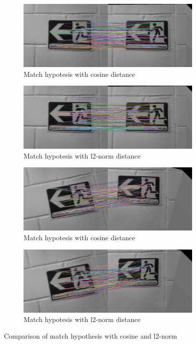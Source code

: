 \begin{figure}[!h]
	\centering
	\begin{subfigure}{0.5\textwidth}
	  \centering
	  \includegraphics[width=0.8\linewidth]{figs/affine_100_cosine_30_8_False_p2-1-1_6-7.jpg}
	  \caption{Match hypotesis with cosine distance}
	\end{subfigure}%
	\begin{subfigure}{0.5\textwidth}
	  \centering
	  \includegraphics[width=0.8\linewidth]{figs/affine_200_l2-norm_30_8_False_p2-1-1_6-7.jpg}
	  \caption{Match hypotesis with l2-norm distance}
	\end{subfigure}
	\begin{subfigure}{0.5\textwidth}
        \centering
        \includegraphics[width=0.8\linewidth]{figs/affine_100_cosine_30_8_False_p2-1-1_139-140.jpg}
        \caption{Match hypotesis with cosine distance}
      \end{subfigure}%
      \begin{subfigure}{0.5\textwidth}
        \centering
        \includegraphics[width=0.8\linewidth]{figs/affine_200_l2-norm_30_8_False_p2-1-1_139-140.jpg}
        \caption{Match hypotesis with l2-norm distance}
      \end{subfigure}%
       \caption{Comparison of match hypothesis with cosine and l2-norm}
	\label{fig:diff-l2-cosine}
\end{figure}

